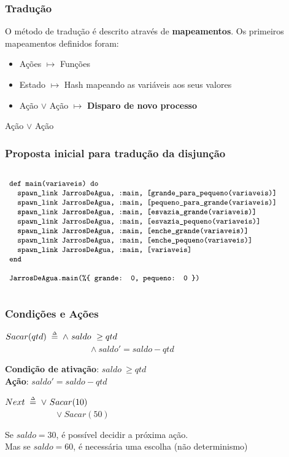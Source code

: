 \documentclass{beamer}
\begin{document}
\begin{frame}
  \frametitle{Tradução}
  O método de tradução é descrito através de \textbf{mapeamentos}. Os primeiros mapeamentos definidos foram:
  \begin{itemize}
    \item Ações $\mapsto$ Funções
    \item Estado $\mapsto$ Hash mapeando as variáveis aos seus valores
    \item Ação $\lor$ Ação $\mapsto$ \textbf{Disparo de novo processo}
  \end{itemize}

  \begin{center}
    \Large{Ação $\lor$ Ação}
  \end{center}
    
\end{frame}

\begin{frame}
  \frametitle{Proposta inicial para tradução da disjunção}
  \hspace{-7mm}
  $\progfig{
  ~def main(variaveis) do\\
  ~~~spawn\_link JarrosDeAgua, :main, [grande\_para\_pequeno(variaveis)]\\
  ~~~spawn\_link JarrosDeAgua, :main, [pequeno\_para\_grande(variaveis)]\\
  ~~~spawn\_link JarrosDeAgua, :main, [esvazia\_grande(variaveis)]\\
  ~~~spawn\_link JarrosDeAgua, :main, [esvazia\_pequeno(variaveis)]\\
  ~~~spawn\_link JarrosDeAgua, :main, [enche\_grande(variaveis)]\\
  ~~~spawn\_link JarrosDeAgua, :main, [enche\_pequeno(variaveis)]\\
  ~~~spawn\_link JarrosDeAgua, :main, [variaveis]\\
  ~end\\\\
  ~JarrosDeAgua.main(\%\{\ grande: 0, pequeno: 0 \})
  }$
\end{frame}

\begin{frame}
  \frametitle{Condições e Ações}
  $Sacar(qtd) \;\mathrel{\smash {{\stackrel{\scriptscriptstyle\Delta}{=}}}}\; \land\ saldo\ \geq qtd$\\
  ~~~~~~~~~~~~~~~~~~~~$\land\ saldo' = saldo - qtd$\\\bigskip
  
  \textbf{Condição de ativação}: $saldo\ \geq qtd$\\
  \textbf{Ação}: $saldo' = saldo - qtd$\\\bigskip\pause
  
  $Next \;\mathrel{\smash {{\stackrel{\scriptscriptstyle\Delta}{=}}}}\; \lor\ Sacar(10)$\\
  ~~~~~~~~~~~~$\lor\ Sacar(50)$\\\bigskip
  
  Se $saldo = 30$, é possível decidir a próxima ação.\\
  Mas se $saldo = 60$, é necessária uma escolha (não determinismo)\\
\end{frame}
\end{document}
